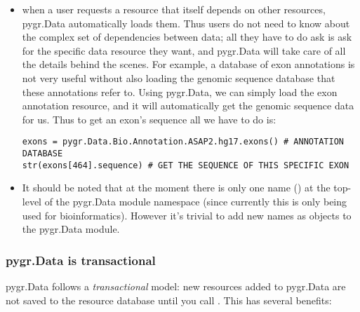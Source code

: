 \documentclass{howto}
\begin{document}
\begin{itemize}
\item when a user requests a resource that itself depends on other
resources, pygr.Data automatically loads them.  Thus users do not need
to know about the complex set of dependencies between data; all they
have to do ask is ask for the specific data resource they want,
and pygr.Data will take care of all the details behind the scenes.
For example, a database of exon annotations is not very useful without
also loading the genomic sequence database that these annotations
refer to.  Using pygr.Data, we can simply load the exon annotation
resource, and it will automatically get the genomic sequence data
for us.  Thus to get an exon's sequence all we have to do is:
\begin{verbatim}
exons = pygr.Data.Bio.Annotation.ASAP2.hg17.exons() # ANNOTATION DATABASE
str(exons[464].sequence) # GET THE SEQUENCE OF THIS SPECIFIC EXON
\end{verbatim}

\item It should be noted that at the moment there is only one name
() at the top-level of the pygr.Data module namespace (since currently
this is only being used for bioinformatics).  However it's 
trivial to add new names as  objects to the pygr.Data
module.

\end{itemize}

\subsubsection{pygr.Data is transactional}

pygr.Data follows a {\em transactional} model: new resources
added to pygr.Data are not saved to the resource database until you
call .  This has several benefits:
\end{document}
